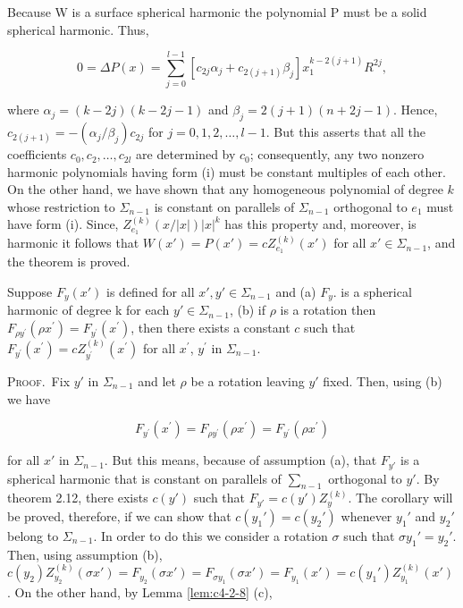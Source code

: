 Because W is a surface spherical harmonic the polynomial P must be a solid spherical harmonic. Thus,

\[
0=\Delta P(x)=\sum_{j=0}^{l-1}[c_{2j}\alpha_{j}+c_{2(j+1)}\beta_{j}]x_{1}^{k-2(j+1)}R^{2j},
\]

where $\alpha_j = (k - 2j)(k - 2j - 1)$ and $\beta_j = 2(j + 1)(n + 2j - 1)$. Hence, $c_{2(j+1)} = -(\alpha_j/\beta_j)c_{2j}$ for $j = 0, 1, 2, \ldots, l - 1$. But this asserts that all the coefficients $c_0, c_2, \ldots, c_{2l}$ are determined by $c_0$; consequently, any two nonzero harmonic polynomials having form (i) must be constant multiples of each other. On the other hand, we have shown that any homogeneous polynomial of degree $k$ whose restriction to $\Sigma_{n-1}$ is constant on parallels of $\Sigma_{n-1}$ orthogonal to $e_1$ must have form (i). Since, $Z_{e_1}^{(k)}(x/|x|)|x|^{k}$ has this property and, moreover, is harmonic it follows that $W(x') = P(x') = cZ_{e_1}^{(k)}(x')$ for all $x' \in \Sigma_{n-1}$, and the theorem is proved.

\begin{corollary}
\label{cor:c4-2-13}
Suppose $F_{y}(x')$ is defined for all $x', y' \in \Sigma_{n-1}$ and
(a) $F_y$. is a spherical harmonic of degree k for each $y' \in \Sigma_{n-1}$,
(b) if $\rho$ is a rotation then $F_{\rho y^{\prime}}(\rho x^{\prime}) = F_{y^{\prime}}(x^{\prime})$, then there exists a constant $c$ such that $F_{y^{\prime}}(x^{\prime}) = c Z_{y^{\prime}}^{(k)}(x^{\prime})$ for all $x^{\prime}$, $y^{\prime}$ in $\Sigma_{n-1}$.
\end{corollary}

\textsc{Proof.}\ Fix $y'$ in $\Sigma_{n-1}$ and let $\rho$ be a rotation leaving $y'$ fixed. Then, using (b) we have

\[
F_{y^{\prime}}(x^{\prime})=F_{\rho y^{\prime}}(\rho x^{\prime})=F_{y^{\prime}}(\rho x^{\prime})
\]

for all $x'$ in $\Sigma_{n-1}$. But this means, because of assumption (a), that $F_{y'}$ is a spherical harmonic that is constant on parallels of $\sum_{n-1}$ orthogonal to $y'$. By theorem 2.12, there exists $c(y')$ such that $F_{y'} = c(y')Z_{y}^{(k)}$. The corollary will be proved, therefore, if we can show that $c(y_1') = c(y_2')$ whenever $y_1'$ and $y_2'$ belong to $\Sigma_{n-1}$. In order to do this we consider a rotation $\sigma$ such that $\sigma y_1' = y_2'$. Then, using assumption (b), $c(y_2)Z_{y_2}^{(k)}(\sigma x') = F_{y_2}(\sigma x') = F_{\sigma y_1}(\sigma x') = F_{y_1}(x') = c(y_1')Z_{y_1}^{(k)}(x')$. On the other hand, by Lemma \ref{lem:c4-2-8} (c),

